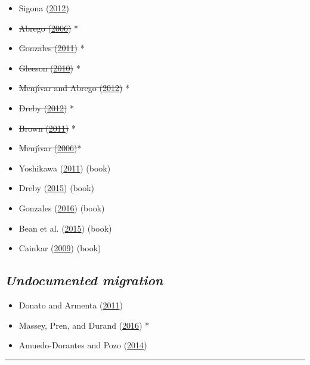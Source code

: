 \documentclass[
]{article}
\providecommand{\tightlist}{%
  \setlength{\itemsep}{0pt}\setlength{\parskip}{0pt}}
\begin{document}
\begin{itemize}
\tightlist
\item
  Sigona (\protect\hyperlink{ref-sigona2012have}{2012})\\
\item
  \sout{Abrego (\protect\hyperlink{ref-abrego2006can}{2006})} *
\item
  \sout{Gonzales (\protect\hyperlink{ref-gonzales2011learning}{2011})} *
\item
  \sout{Gleeson (\protect\hyperlink{ref-gleeson2010labor}{2010})} *
\item
  \sout{Menjı́var and Abrego
  (\protect\hyperlink{ref-menjivar2012legal}{2012})} *
\item
  \sout{Dreby (\protect\hyperlink{ref-dreby2012burden}{2012})} *
\item
  \sout{Brown (\protect\hyperlink{ref-brown2011refugees}{2011})} *
\item
  \sout{Menjı́var (\protect\hyperlink{ref-menjivar2006liminal}{2006})}*
\item
  Yoshikawa (\protect\hyperlink{ref-yoshikawa2011immigrants}{2011})
  (book)
\item
  Dreby (\protect\hyperlink{ref-dreby2015everyday}{2015}) (book)
\item
  Gonzales (\protect\hyperlink{ref-gonzales2016lives}{2016}) (book)
\item
  Bean et al. (\protect\hyperlink{ref-bean2015parents}{2015}) (book)
\item
  Cainkar (\protect\hyperlink{ref-cainkar2009homeland}{2009}) (book)
\end{itemize}

\hypertarget{undocumented-migration}{%
\subsection{\texorpdfstring{\emph{Undocumented
migration}}{Undocumented migration}}\label{undocumented-migration}}

\begin{itemize}
\tightlist
\item
  Donato and Armenta (\protect\hyperlink{ref-donato2011we}{2011})
\item
  Massey, Pren, and Durand
  (\protect\hyperlink{ref-massey2016border}{2016}) *
\item
  Amuedo-Dorantes and Pozo
  (\protect\hyperlink{ref-amuedo2014intended}{2014})
\end{itemize}

\begin{center}\rule{0.5\linewidth}{0.5pt}\end{center}
\end{document}
